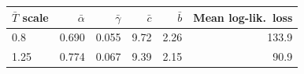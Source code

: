 \begin{tabular}{lrrrrr}
\toprule
$\bar T$ scale & $\bar\alpha$ & $\bar\gamma$ & $\bar c$ & $\bar b$ & Mean log-lik.\ loss\\
\midrule
0.8 & 0.690 & 0.055 & 9.72 & 2.26 & 133.9\\
1.25 & 0.774 & 0.067 & 9.39 & 2.15 & 90.9\\
\bottomrule
\end{tabular}
